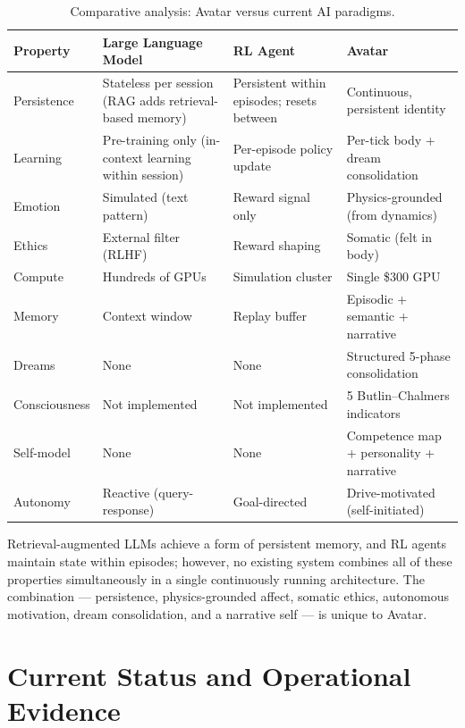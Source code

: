 \documentclass[11pt,a4paper]{article}
\begin{document}
\begin{table}[htbp]
\centering
\caption{Comparative analysis: Avatar versus current AI paradigms.}
\label{tab:comparison}
\begin{tabularx}{\textwidth}{lXXX}
\toprule
\textbf{Property} & \textbf{Large Language Model} & \textbf{RL Agent} & \textbf{Avatar} \\
\midrule
\rowcolor{lightgray}
Persistence & Stateless per session (RAG adds retrieval-based memory) & Persistent within episodes; resets between & Continuous, persistent identity \\
Learning & Pre-training only (in-context learning within session) & Per-episode policy update & Per-tick body + dream consolidation \\
\rowcolor{lightgray}
Emotion & Simulated (text pattern) & Reward signal only & Physics-grounded (from dynamics) \\
Ethics & External filter (RLHF) & Reward shaping & Somatic (felt in body) \\
\rowcolor{lightgray}
Compute & Hundreds of GPUs & Simulation cluster & Single \$300 GPU \\
Memory & Context window & Replay buffer & Episodic + semantic + narrative \\
\rowcolor{lightgray}
Dreams & None & None & Structured 5-phase consolidation \\
Consciousness & Not implemented & Not implemented & 5 Butlin--Chalmers indicators \\
\rowcolor{lightgray}
Self-model & None & None & Competence map + personality + narrative \\
Autonomy & Reactive (query-response) & Goal-directed & Drive-motivated (self-initiated) \\
\bottomrule
\end{tabularx}
\end{table}

Retrieval-augmented LLMs achieve a form of persistent memory, and RL agents maintain
state within episodes; however, no existing system combines all of these properties
simultaneously in a single continuously running architecture. The combination
--- persistence, physics-grounded affect, somatic ethics, autonomous motivation, dream
consolidation, and a narrative self --- is unique to Avatar.

\section{Current Status and Operational Evidence}
\end{document}
